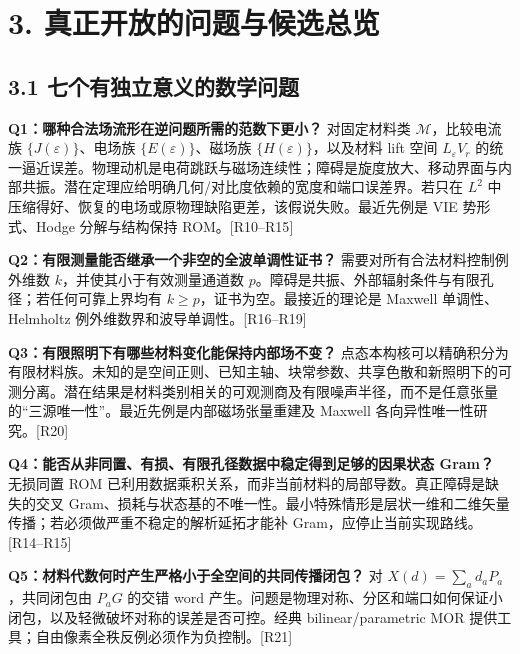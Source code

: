 \documentclass[11pt,a4paper]{article}
\begin{document}
\hypertarget{ux771fux6b63ux5f00ux653eux7684ux95eeux9898ux4e0eux5019ux9009ux603bux89c8}{%
\section{3.
真正开放的问题与候选总览}\label{ux771fux6b63ux5f00ux653eux7684ux95eeux9898ux4e0eux5019ux9009ux603bux89c8}}

\hypertarget{ux4e03ux4e2aux6709ux72ecux7acbux610fux4e49ux7684ux6570ux5b66ux95eeux9898}{%
\subsection{3.1
七个有独立意义的数学问题}\label{ux4e03ux4e2aux6709ux72ecux7acbux610fux4e49ux7684ux6570ux5b66ux95eeux9898}}

\textbf{Q1：哪种合法场流形在逆问题所需的范数下更小？} 对固定材料类
\(\mathcal M\)，比较电流族 \(\{J(\varepsilon)\}\)、电场族
\(\{E(\varepsilon)\}\)、磁场族 \(\{H(\varepsilon)\}\)，以及材料 lift
空间 \(L_\varepsilon V_r\)
的统一逼近误差。物理动机是电荷跳跃与磁场连续性；障碍是旋度放大、移动界面与内部共振。潜在定理应给明确几何/对比度依赖的宽度和端口误差界。若只在
\(L^2\) 中压缩得好、恢复的电场或原物理缺陷更差，该假说失败。最近先例是
VIE 势形式、Hodge 分解与结构保持 ROM。{[}R10--R15{]}

\textbf{Q2：有限测量能否继承一个非空的全波单调性证书？}
需要对所有合法材料控制例外维数 \(k\)，并使其小于有效测量通道数
\(p\)。障碍是共振、外部辐射条件与有限孔径；若任何可靠上界均有
\(k\ge p\)，证书为空。最接近的理论是 Maxwell 单调性、Helmholtz
例外维数界和波导单调性。{[}R16--R19{]}

\textbf{Q3：有限照明下有哪些材料变化能保持内部场不变？}
点态本构核可以精确积分为有限材料族。未知的是空间正则、已知主轴、块常参数、共享色散和新照明下的可测分离。潜在结果是材料类别相关的可观测商及有限噪声半径，而不是任意张量的``三源唯一性''。最近先例是内部磁场张量重建及
Maxwell 各向异性唯一性研究。{[}R20{]}

\textbf{Q4：能否从非同置、有损、有限孔径数据中稳定得到足够的因果状态
Gram？} 无损同置 ROM
已利用数据乘积关系，而非当前材料的局部导数。真正障碍是缺失的交叉
Gram、损耗与状态基的不唯一性。最小特殊情形是层状一维和二维矢量传播；若必须做严重不稳定的解析延拓才能补
Gram，应停止当前实现路线。{[}R14--R15{]}

\textbf{Q5：材料代数何时产生严格小于全空间的共同传播闭包？} 对
\(X(d)=\sum_a d_aP_a\)，共同闭包由 \(P_aG\) 的交错 word
产生。问题是物理对称、分区和端口如何保证小闭包，以及轻微破坏对称的误差是否可控。经典
bilinear/parametric MOR
提供工具；自由像素全秩反例必须作为负控制。{[}R21{]}
\end{document}
